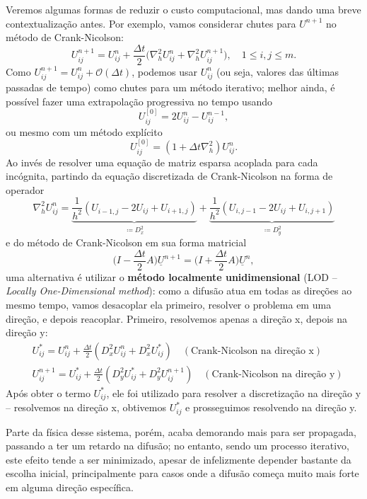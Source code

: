 \documentclass[../differential_methods.tex]{subfiles}
\begin{document}
Veremos algumas formas de reduzir o custo computacional, mas dando uma breve contextualização antes. Por exemplo, vamos considerar chutes para \(U^{n+1}\) no método de Crank-Nicolson:
\[
	U_{ij}^{n+1} = U_{ij}^{n} + \frac{\Delta t}{2}\biggl(\nabla_{h}^{2}U_{ij}^{n}+\nabla_{h}^{2} U_{ij}^{n+1}\biggr), \quad 1 \leq i, j\leq m.
\]
Como \(U_{ij}^{n+1} = U_{ij}^{n} + \mathcal{O}(\Delta t)\), podemos usar \(U_{ij}^{n}\) (ou seja, valores das últimas passadas de tempo) como chutes para um método iterativo; melhor ainda, é possível fazer uma extrapolação progressiva no tempo usando
\[
	U_{ij}^{[0]} = 2U_{ij}^{n} - U_{ij}^{n-1},
\]
ou mesmo com um método explícito
\[
	U_{ij}^{[0]} = (1+\Delta t \nabla _{h}^{2})U_{ij}^{n}.
\]
Ao invés de resolver uma equação de matriz esparsa acoplada para cada incógnita, partindo da equação discretizada de Crank-Nicolson na forma de operador
\[
	\nabla_{h}^{2}U_{ij}^{n} = \underbrace{\frac{1}{h^{2}}(U_{i-1, j}^{}-2U_{ij}+U_{i+1, j})}_{\coloneqq D_{x}^{2}} + \underbrace{\frac{1}{h^{2}}(U_{i, j-1} - 2U_{ij} + U_{i, j+1})}_{\coloneqq D_{y}^{2}}
\]
e do método de Crank-Nicolson em sua forma matricial
\[
	\biggl(I - \frac{\Delta t}{2}A\biggr)\underline{U}^{n+1} = \biggl(I + \frac{\Delta t}{2}A\biggr)\underline{U}^{n},
\]
uma alternativa é utilizar o \textbf{método localmente unidimensional} (LOD -- \textit{Locally One-Dimensional method}): como a difusão atua em todas as direções ao mesmo tempo, vamos desacoplar ela primeiro, resolver o problema em uma direção, e depois reacoplar. Primeiro, resolvemos apenas a direção x, depois na direção y:
\begin{align*}
	 & U_{ij}^{*} = U_{ij}^{n} + \frac{\Delta t}{2}(D_{x}^{2}U_{ij}^{n} + D_{x}^{2}U_{ij}^{*}) \quad (\text{Crank-Nicolson na direção x})     \\
	 & U_{ij}^{n+1} = U_{ij}^{*} + \frac{\Delta t}{2}(D_{y}^{2}U_{ij}^{*} + D_{y}^{2}U_{ij}^{n+1}) \quad (\text{Crank-Nicolson na direção y})
\end{align*}
Após obter o termo \(U_{ij}^{*}\), ele foi utilizado para resolver a discretização na direção y -- resolvemos na direção x, obtivemos \(U_{ij}^{*}\) e prosseguimos resolvendo na direção y.

Parte da física desse sistema, porém, acaba demorando mais para ser propagada, passando a ter um retardo na difusão; no entanto, sendo um processo iterativo, este efeito tende a ser minimizado, apesar de infelizmente depender bastante da escolha inicial, principalmente para casos onde a difusão começa muito mais forte em alguma direção específica.
\end{document}
